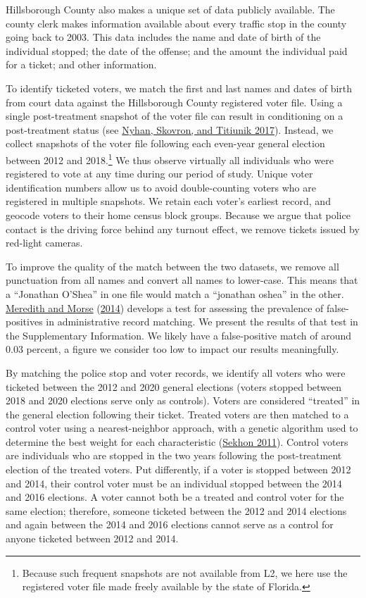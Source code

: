 \documentclass[
  12pt,
]{article}
\begin{document}
Hillsborough County also makes a unique set of data publicly available. The county clerk makes information available about every traffic stop in the county going back to 2003. This data includes the name and date of birth of the individual stopped; the date of the offense; and the amount the individual paid for a ticket; and other information.

To identify ticketed voters, we match the first and last names and dates of birth from court data against the Hillsborough County registered voter file. Using a single post-treatment snapshot of the voter file can result in conditioning on a post-treatment status (see \protect\hyperlink{ref-Nyhan2017}{Nyhan, Skovron, and Titiunik 2017}). Instead, we collect snapshots of the voter file following each even-year general election between 2012 and 2018.\footnote{Because such frequent snapshots are not available from L2, we here use the registered voter file made freely available by the state of Florida.} We thus observe virtually all individuals who were registered to vote at any time during our period of study. Unique voter identification numbers allow us to avoid double-counting voters who are registered in multiple snapshots. We retain each voter's earliest record, and geocode voters to their home census block groups. Because we argue that police contact is the driving force behind any turnout effect, we remove tickets issued by red-light cameras.

To improve the quality of the match between the two datasets, we remove all punctuation from all names and convert all names to lower-case. This means that a ``Jonathan O'Shea'' in one file would match a ``jonathan oshea'' in the other. \protect\hyperlink{ref-Meredith2014}{Meredith and Morse} (\protect\hyperlink{ref-Meredith2014}{2014}) develops a test for assessing the prevalence of false-positives in administrative record matching. We present the results of that test in the Supplementary Information. We likely have a false-positive match of around 0.03 percent, a figure we consider too low to impact our results meaningfully.

By matching the police stop and voter records, we identify all voters who were ticketed between the 2012 and 2020 general elections (voters stopped between 2018 and 2020 elections serve only as controls). Voters are considered ``treated'' in the general election following their ticket. Treated voters are then matched to a control voter using a nearest-neighbor approach, with a genetic algorithm used to determine the best weight for each characteristic (\protect\hyperlink{ref-Sekhon2011}{Sekhon 2011}). Control voters are individuals who are stopped in the two years following the post-treatment election of the treated voters. Put differently, if a voter is stopped between 2012 and 2014, their control voter must be an individual stopped between the 2014 and 2016 elections. A voter cannot both be a treated and control voter for the same election; therefore, someone ticketed between the 2012 and 2014 elections and again between the 2014 and 2016 elections cannot serve as a control for anyone ticketed between 2012 and 2014.
\end{document}
